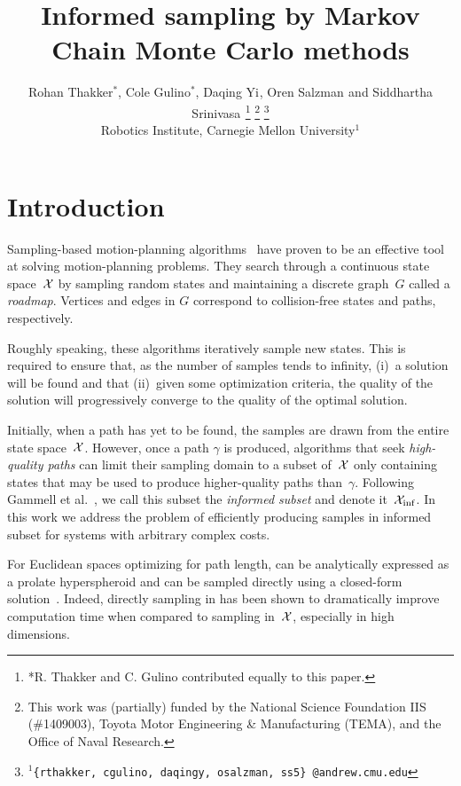\documentclass[letterpaper, 10 pt, conference]{ieeeconf}  %
\title{\LARGE \bf
Informed sampling by Markov Chain Monte Carlo methods
}
\author{
Rohan Thakker$^{*}$,
Cole Gulino$^{*}$,
Daqing Yi$^{}$,
Oren Salzman$^{}$ and
Siddhartha Srinivasa$^{}$%
\thanks{*R. Thakker and C. Gulino contributed equally to this paper.}
\thanks{This work was (partially) funded by the National Science Foundation IIS (\#1409003), Toyota Motor Engineering \& Manufacturing (TEMA), and the Office of Naval Research.}%
\thanks{$^{1}${\tt\small \{rthakker, cgulino, daqingy, osalzman, ss5\} @andrew.cmu.edu}}%
%
\\        
Robotics Institute, Carnegie Mellon University$^{1}$
}
\begin{document}
\maketitle
\thispagestyle{empty}
\pagestyle{empty}


\begin{abstract}

\end{abstract}


\section{Introduction}
\label{sec:intro}


Sampling-based motion-planning algorithms~\cite{CBHKKLT05, L06} have proven to be an effective tool at solving motion-planning problems.
They search through a continuous state space~$\mathcal{X}$ by sampling random states and maintaining a discrete graph~$G$ called a \emph{roadmap}.
Vertices and edges in $G$ correspond to collision-free states and paths, respectively.

Roughly speaking, these algorithms iteratively sample new states.
This is required to ensure that, as the number of samples tends to infinity, 
(i)~a solution will be found 
and that
(ii)~given some optimization criteria, the quality of the solution will progressively converge to the quality of the optimal solution.

Initially, 
when a path has yet to be found, 
the samples are drawn from the entire state space~$\mathcal{X}$.
However, once a path $\gamma$ is produced,  algorithms that seek \emph{high-quality paths} can limit their sampling domain to a subset of~$\mathcal{X}$ only  containing states that may be used to produce higher-quality paths than~$\gamma$.
Following Gammell et al.~\cite{GSB14}, we call this subset the \emph{informed subset} and denote it~$\mathcal{X}_{\rm {inf}}$.
In this work we address the problem of efficiently producing samples in informed subset for systems with arbitrary complex costs. 

For Euclidean spaces optimizing for path length, 
\Cinf can be analytically expressed as a prolate hyperspheroid and can be sampled directly using a closed-form solution~\cite{GSB14}.
Indeed, directly sampling in \Cinf has been shown to dramatically improve computation time when compared to sampling in~$\mathcal{X}$, especially in high dimensions. 
\end{document}
